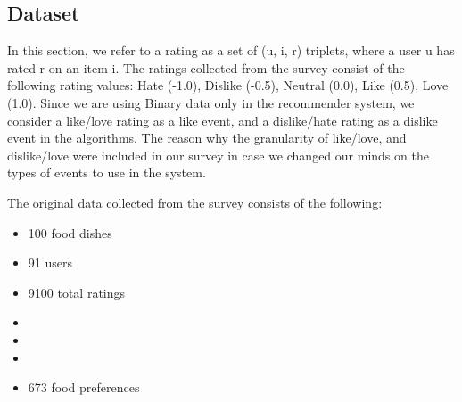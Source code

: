 \subsection{Dataset}

In this section, we refer to a rating as a set of (u, i, r) triplets, where a user u has rated r on an item i. 
The ratings collected from the survey consist of the following rating values: Hate (-1.0), Dislike (-0.5), Neutral (0.0), Like (0.5), Love (1.0). Since we are using Binary data only in the recommender system, we consider a like/love rating as a like event, and a dislike/hate rating as a dislike event in the algorithms. The reason why the granularity of like/love, and dislike/love were included in our survey in case we changed our minds on the types of events to use in the system.

The original data collected from the survey consists of the following:
\begin{itemize}
	\item{100 food dishes}
	\item{91 users}
	\item{9100 total ratings}
	\item{} 
	\item{}
	\item{}
	\item{673 food preferences}
\end{itemize}

% 

